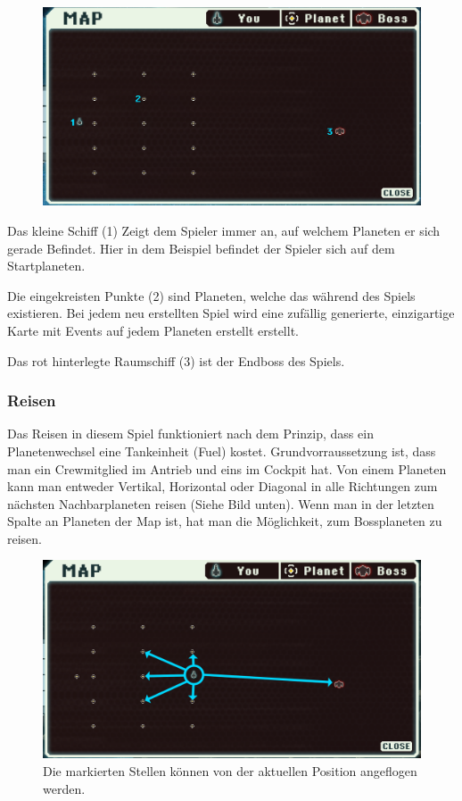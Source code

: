 \documentclass[fontsize=12pt,paper=a4,twoside]{scrartcl}
\begin{document}
\begin{figure}[H]
\centering
\includegraphics[width=0.8\linewidth]{dasspiel/karte/karteuebersicht.png}
\end{figure} 


Das kleine Schiff (1) Zeigt dem Spieler immer an, auf welchem Planeten er sich gerade Befindet. Hier in dem Beispiel befindet der Spieler sich auf dem Startplaneten. 

Die eingekreisten Punkte (2) sind Planeten, welche das während des Spiels existieren. Bei jedem neu erstellten Spiel wird eine zufällig generierte, einzigartige Karte mit Events auf jedem Planeten erstellt erstellt. 

Das rot hinterlegte Raumschiff (3) ist der Endboss des Spiels. 

\subsubsection{Reisen} 

Das Reisen in diesem Spiel funktioniert nach dem Prinzip, dass ein Planetenwechsel eine Tankeinheit (Fuel) kostet. Grundvorraussetzung ist, dass man ein Crewmitglied im Antrieb und eins im Cockpit hat. Von einem Planeten kann man entweder Vertikal, Horizontal oder Diagonal in alle Richtungen zum nächsten Nachbarplaneten reisen (Siehe Bild unten). Wenn man in der letzten Spalte an Planeten der Map ist, hat man die Möglichkeit, zum Bossplaneten zu reisen.

\begin{figure}[H]
\centering
\includegraphics[width=0.8\linewidth]{DasSpiel/Karte/wohinReisen.png}
\caption{Die markierten Stellen können von der aktuellen Position angeflogen werden.}
\end{figure} 
\end{document}
